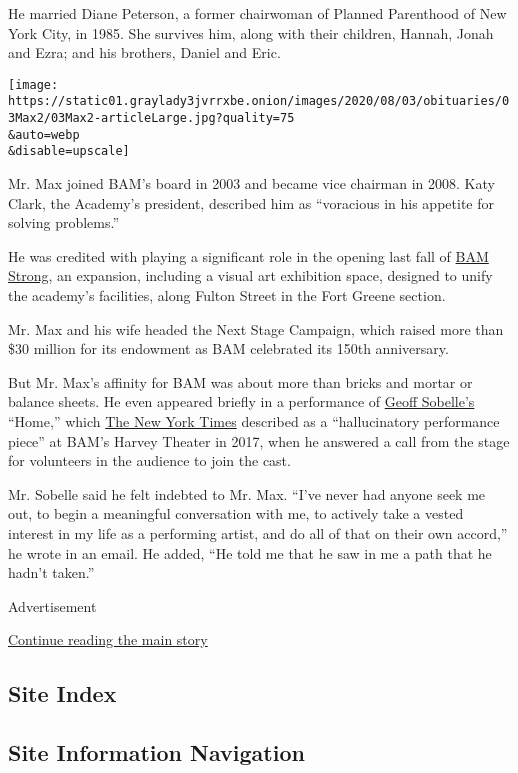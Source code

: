 He married Diane Peterson, a former chairwoman of Planned Parenthood of
New York City, in 1985. She survives him, along with their children,
Hannah, Jonah and Ezra; and his brothers, Daniel and Eric.

\texttt{[image: https://static01.graylady3jvrrxbe.onion/images/2020/08/03/obituaries/03Max2/03Max2-articleLarge.jpg?quality=75\\\&auto=webp\\\&disable=upscale]}

Mr. Max joined BAM's board in 2003 and became vice chairman in 2008.
Katy Clark, the Academy's president, described him as ``voracious in his
appetite for solving problems.''

He was credited with playing a significant role in the opening last fall
of
\href{https://blog.bam.org/2019/03/a-first-look-at-bam-strong.html}{BAM
Strong}, an expansion, including a visual art exhibition space, designed
to unify the academy's facilities, along Fulton Street in the Fort
Greene section.

Mr. Max and his wife headed the Next Stage Campaign, which raised more
than \$30 million for its endowment as BAM celebrated its 150th
anniversary.

But Mr. Max's affinity for BAM was about more than bricks and mortar or
balance sheets. He even appeared briefly in a performance of
\href{https://www.nytimes3xbfgragh.onion/2014/11/07/theater/geoff-sobelles-the-object-lesson-at-bam.html}{Geoff
Sobelle's} ``Home,'' which
\href{https://www.nytimes3xbfgragh.onion/2017/12/07/theater/home-geoff-sobelle-review.html}{The
New York Times} described as a ``hallucinatory performance piece'' at
BAM's Harvey Theater in 2017, when he answered a call from the stage for
volunteers in the audience to join the cast.

Mr. Sobelle said he felt indebted to Mr. Max. ``I've never had anyone
seek me out, to begin a meaningful conversation with me, to actively
take a vested interest in my life as a performing artist, and do all of
that on their own accord,'' he wrote in an email. He added, ``He told me
that he saw in me a path that he hadn't taken.''

Advertisement

\protect\hyperlink{after-bottom}{Continue reading the main story}

\hypertarget{site-index}{%
\subsection{Site Index}\label{site-index}}

\hypertarget{site-information-navigation}{%
\subsection{Site Information
Navigation}\label{site-information-navigation}}

